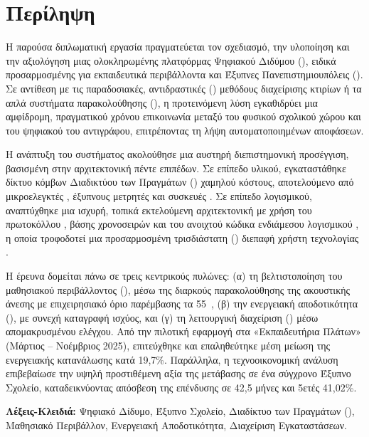 \chapter*{Περίληψη}

Η παρούσα διπλωματική εργασία πραγματεύεται τον σχεδιασμό, την υλοποίηση και την αξιολόγηση μιας ολοκληρωμένης πλατφόρμας Ψηφιακού Διδύμου (), ειδικά προσαρμοσμένης για εκπαιδευτικά περιβάλλοντα και Έξυπνες Πανεπιστημιουπόλεις (). Σε αντίθεση με τις παραδοσιακές, αντιδραστικές () μεθόδους διαχείρισης κτιρίων ή τα απλά συστήματα παρακολούθησης (), η προτεινόμενη λύση εγκαθιδρύει μια αμφίδρομη, πραγματικού χρόνου επικοινωνία μεταξύ του φυσικού σχολικού χώρου και του ψηφιακού του αντιγράφου, επιτρέποντας τη λήψη αυτοματοποιημένων αποφάσεων.

Η ανάπτυξη του συστήματος ακολούθησε μια αυστηρή διεπιστημονική προσέγγιση, βασισμένη στην αρχιτεκτονική πέντε επιπέδων. Σε επίπεδο υλικού, εγκαταστάθηκε δίκτυο κόμβων Διαδικτύου των Πραγμάτων () χαμηλού κόστους, αποτελούμενο από μικροελεγκτές , έξυπνους μετρητές  και συσκευές . Σε επίπεδο λογισμικού, αναπτύχθηκε μια ισχυρή, τοπικά εκτελούμενη αρχιτεκτονική με χρήση του πρωτοκόλλου , βάσης χρονοσειρών  και του ανοιχτού κώδικα ενδιάμεσου λογισμικού , η οποία τροφοδοτεί μια προσαρμοσμένη τρισδιάστατη () διεπαφή χρήστη τεχνολογίας .

Η έρευνα δομείται πάνω σε τρεις κεντρικούς πυλώνες: (α) τη βελτιστοποίηση του μαθησιακού περιβάλλοντος (), μέσω της διαρκούς παρακολούθησης της ακουστικής άνεσης με επιχειρησιακό όριο παρέμβασης τα 55~, (β) την ενεργειακή αποδοτικότητα (), με συνεχή καταγραφή ισχύος, και (γ) τη λειτουργική διαχείριση () μέσω απομακρυσμένου ελέγχου. Από την πιλοτική εφαρμογή στα «Εκπαιδευτήρια Πλάτων» (Μάρτιος -- Νοέμβριος 2025), επιτεύχθηκε και επαληθεύτηκε μέση μείωση της ενεργειακής κατανάλωσης κατά 19,7\%. Παράλληλα, η τεχνοοικονομική ανάλυση επιβεβαίωσε την υψηλή προστιθέμενη αξία της μετάβασης σε ένα σύγχρονο Έξυπνο Σχολείο, καταδεικνύοντας απόσβεση της επένδυσης σε 42,5 μήνες και 5ετές  41,02\%.

\noindent\textbf{Λέξεις-Κλειδιά:} Ψηφιακό Δίδυμο, Έξυπνο Σχολείο, Διαδίκτυο των Πραγμάτων (), Μαθησιακό Περιβάλλον, Ενεργειακή Αποδοτικότητα, Διαχείριση Εγκαταστάσεων.

